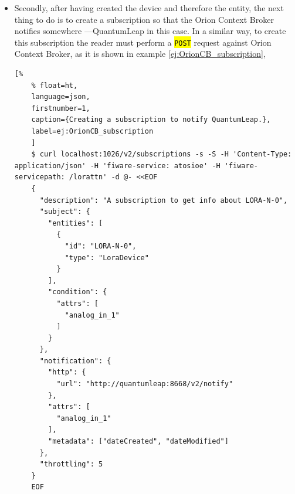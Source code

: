 \documentclass[11pt,a4paper,dvipsnames,twoside]{article}
\newcommand{\cmd}[1] {\hl{\texttt{#1}}}
\begin{document}
\begin{itemize}
  When a new device is created, \textbf{IoTagent-LoRaWAN} causes that \textbf{Orion Context Broker} creates a new entity. In fact this can be checked performing a \cmd{GET} HTTP request, 

  \begin{lstlisting}[%
    % float=ht,
    language=json,
    firstnumber=1,
    caption={Querying OrionCB for entities list.},
    label=ej:OrionCB_entities_Get
    ]
    $ curl localhost:1026/v2/entities \                                                                       
       -H 'fiware-service: atosioe' \
       -H 'fiware-servicepath: /lorattn' | python -mjson.tool
      % Total    % Received % Xferd  Average Speed   Time    Time     Time  Current
                                     Dload  Upload   Total   Spent    Left  Speed
    100   248  100   248    0     0   4275      0 --:--:-- --:--:-- --:--:--  4275
    [
        {
            "id": "LORA-N-0",
            "type": "LoraDevice",
            "TimeInstant": {
                "type": "DateTime",
                "value": "2020-06-27T15:58:48.00Z",
                "metadata": {}
            },
            "analog_in_1": {
                "type": "Number",
                "value": 55.03,
                "metadata": {
                    "TimeInstant": {
                        "type": "DateTime",
                        "value": "2020-06-27T15:58:48.00Z"
                    }
                }
            }
        }
    ]
  \end{lstlisting}

  Example \ref{ej:OrionCB_entities_Get} shows the response of that \cmd{GET} request when a new entity is created by Orion Context Broker.

  \item Secondly, after having created the device and therefore the entity, the next thing to do is to create a subscription so that the Orion Context Broker notifies somewhere ---QuantumLeap in this case. In a similar way, to create this subscription the reader must perform a \cmd{POST} request against Orion Context Broker, as it is shown in example \ref{ej:OrionCB_subscription}, 
  
  \begin{lstlisting}[%
    % float=ht,
    language=json,
    firstnumber=1,
    caption={Creating a subscription to notify QuantumLeap.},
    label=ej:OrionCB_subscription
    ]
    $ curl localhost:1026/v2/subscriptions -s -S -H 'Content-Type: application/json' -H 'fiware-service: atosioe' -H 'fiware-servicepath: /lorattn' -d @- <<EOF
    {
      "description": "A subscription to get info about LORA-N-0",
      "subject": {
        "entities": [
          {
            "id": "LORA-N-0",
            "type": "LoraDevice"
          }
        ],
        "condition": {
          "attrs": [
            "analog_in_1"
          ]
        }
      },
      "notification": {
        "http": {
          "url": "http://quantumleap:8668/v2/notify"
        },
        "attrs": [
          "analog_in_1"
        ],
        "metadata": ["dateCreated", "dateModified"]
      },
      "throttling": 5
    }
    EOF
  \end{lstlisting}


\end{itemize}
\end{document}
